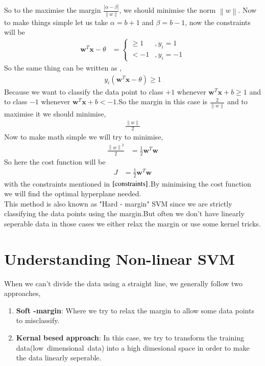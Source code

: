 \documentclass[journal,12pt,onecolumn]{IEEEtran}
\providecommand{\brak}[1]{\ensuremath{\left(#1\right)}}
\theoremstyle{remark}
\providecommand{\abs}[1]{\left\vert#1\right\vert}
\providecommand{\norm}[1]{\left\lVert#1\right\rVert}
\numberwithin{equation}{section}
\let\vec\mathbf
\begin{document}
	       So to the maximise the margin $\frac{\abs{\alpha - \beta}}{\norm{w}}$, we should minimise the norm $\norm{w}$. Now to make things simple let us take $\alpha = b + 1$ and $\beta = b - 1$, now the constraints will be 
	        \begin{align}
			\vec{w}^T\vec{x} - \theta &= \begin{cases} \label{constraints}
                                                       \geq 1 &,y_i = 1\\
                                                        < -1   &, y_i = -1
                                                   \end{cases} 
                \end{align} 
		So the same thing can be written as ,
		\begin{align}
			y_i\brak{\vec{w}^T\vec{x} - \theta} \geq 1
		\end{align}
		Because we want to classify the data point to class $+1$ whenever $\vec{w}^T\vec{x} + b \geq 1$ and to class $-1$ whenever $\vec{w}^T\vec{x} + b < -1$.So the margin in this case is $\frac{2}{\norm{w}}$ and to maximise it we should minimise,
		\begin{align}
		    \frac{\norm{w}}{2}
	        \end{align}
		Now to make math simple we will try to minimise,
		\begin{align}
			\frac{\norm{w}^2}{2} &= \frac{1}{2}\vec{w}^T\vec{w}
	        \end{align}
 So here the cost function will be 
                \begin{align}
			J &= \frac{1}{2}\vec{w}^T\vec{w}
		\end{align}
		with the constraints mentioned in $\eqref{constraints}$.By minimising the cost function we will find the optimal hyperplane needed.\\
	This method is also known as "Hard - margin" SVM since we are strictly classifying the data points using the margin.But often we don't have linearly seperable data in those cases we either relax the margin or use some kernel tricks.
	  \section{Understanding Non-linear SVM}
	    When we can't divide the data using a straight line, we generally follow two approaches,
	         \begin{enumerate}
		   \item \textbf{Soft -margin}: Where we try to relax the margin to allow some data points to misclassify.
	           \item \textbf{Kernal besed approach}: In this case, we try to transform the training data(low\, dimensional\, data) into a high dimesional space in order to make the data linearly seperable.
	         \end{enumerate}
\end{document}
